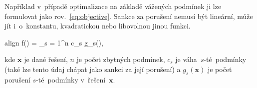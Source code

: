 \documentclass[twoside]{ctuthesis}
\newcommand{\coloredeq}[2]{\begin{empheq}[box=\colorbox{Gray}]{align}\label{#1}\hspace{1em}#2\hspace{1em}\end{empheq}}
\begin{document}
Například v~případě optimalizace na základě vážených podmínek ji lze formulovat jako rov.~\ref{eq:objective}. Sankce za porušení nemusí být lineární, může jít i~o~konstantu, kvadratickou nebo libovolnou jinou funkci. \cite{kletzander2020solving}
\coloredeq{eq:objective}{
	f() = \sum_{s = 1}^n c_s \cdot g_s(\boldsymbol{x}),
}
kde $\boldsymbol{x}$ je dané řešení, $n$ je počet zbytných podmínek, $c_s$ je váha~$s$-té~podmínky (také lze tento údaj chápat jako sankci za její porušení) a $g_s(\boldsymbol{x})$ je počet porušení $s$-té~podmínky v~řešení~$\boldsymbol{x}$. \cite{awadallah2015hybrid}

%
%
%
%
% 	
%
\end{document}
